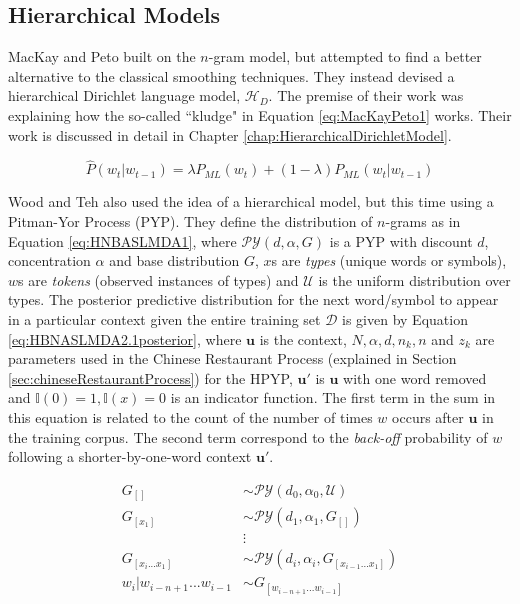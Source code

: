 \subsection{Hierarchical Models}

MacKay and Peto \cite{mackay1995hierarchical} built on the $n$-gram model, but attempted to find a better alternative to the classical smoothing techniques. They instead devised a hierarchical Dirichlet language model, $\mathscr{H}_{D}$. The premise of their work was explaining how the so-called ``kludge" in Equation \ref{eq:MacKayPeto1} works. Their work is discussed in detail in Chapter \ref{chap:HierarchicalDirichletModel}.



\begin{equation}
\hat{P}(w_{t}|w_{t-1})=\lambda P_{ML}(w_{t})+(1-\lambda)P_{ML}(w_{t}|w_{t-1})
\label{eq:MacKayPeto1}
\end{equation}




Wood and Teh \cite{wood2009hierarchical} also used the idea of a hierarchical model, but this time using a Pitman-Yor Process (PYP). They define the distribution of $n$-grams as in Equation \ref{eq:HNBASLMDA1}, where $\mathcal{PY}(d,\alpha,G)$ is a PYP with discount $d$, concentration $\alpha$ and base distribution $G$, $x$s are \textit{types} (unique words or symbols), $w$s are \textit{tokens} (observed instances of types) and $\mathcal{U}$ is the uniform distribution over types. The posterior predictive distribution for the next word/symbol to appear in a particular context given the entire training set $\mathcal{D}$ is given by Equation \ref{eq:HBNASLMDA2.1posterior}, where $\boldsymbol{u}$ is the context, $N,\alpha,d,n_{k}, n$ and $z_{k}$ are parameters used in the Chinese Restaurant Process (explained in Section \ref{sec:chineseRestaurantProcess}) for the HPYP, $\boldsymbol{u}'$ is $\boldsymbol{u}$ with one word removed and $\mathbb{I}(0)=1,\mathbb{I}(x)=0$ is an indicator function. The first term in the sum in this equation is related to the count of the number of times $w$ occurs after $\boldsymbol{u}$ in the training corpus. The second term correspond to the \textit{back-off} probability of $w$ following a shorter-by-one-word context $\boldsymbol{u}'$.

\begin{align}
G_{[]}&\sim\mathcal{PY}(d_{0},\alpha_{0},\mathcal{U}) \nonumber
\\
G_{[x_{1}]}&\sim\mathcal{PY}(d_{1},\alpha_{1},G_{[]}) \nonumber
\\
&\vdots\nonumber 
\\
G_{[x_{i}...x_{1}]}&\sim\mathcal{PY}(d_{i},\alpha_{i},G_{[x_{i-1}...x_{1}]}) \nonumber
\\
w_{i}|w_{i-n+1}...w_{i-1}&\sim G_{[w_{i-n+1}...w_{i-1}]} 
\label{eq:HNBASLMDA1}
\end{align}


